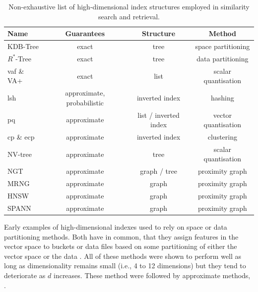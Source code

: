 \begin{table}
    \begin{tabular}{ | l | c | c | c |}
        \hline
        \textbf{Name} & \textbf{Guarantees} & \textbf{Structure} & \textbf{Method} \\
        \hline
        \hline
        KDB-Tree \cite{Robinson:1981KDB} & exact & tree & space partitioning \\  
        \hline
        $R^{*}$-Tree \cite{Beckmann:1990RTree} & exact & tree & data partitioning \\ 
        \hline
        \acrshort{vaf} \& VA+ \cite{Weber:1998Va,Ferhatosmanoglu:2000Vector} & exact & list & scalar quantisation \\ 
        \hline
        \acrshort{lsh} \cite{Indyk1998:Approximate, Wang:2017ASurvey} & approximate, probabilistic & inverted index & hashing \\ 
        \hline
        \acrshort{pq} \cite{Jegou:2010Product} & approximate & list / inverted index & vector quantisation \\
        \hline 
        \acrshort{cp} \& e\acrshort{cp} \cite{Chierichetti:2007Finding,Gudmundsson:2010Large} & approximate & inverted index & clustering \\ 
        \hline
        NV-tree \cite{Lejsek:2009NVTree} & approximate & tree & scalar quantisation \\ 
        \hline
        NGT \cite{Iwasaki2016:Pruned} & approximate & graph / tree & proximity graph \\ 
        \hline
        MRNG \cite{Lejsek:2009NVTree} & approximate & graph & proximity graph \\ 
        \hline
        HNSW \cite{Malkov:2018Efficient} & approximate & graph & proximity graph \\ 
        \hline
        SPANN \cite{Chen:2021SPANN} & approximate & graph & proximity graph \\ 
        \hline
    \end{tabular}
    \caption{Non-exhaustive list of high-dimensional index structures employed in similarity search and retrieval.}
    \label{table:index_structures}
\end{table}

Early examples of high-dimensional indexes used to rely on space or data partitioning methods. Both have in common, that they assign features in the vector space to buckets or data files based on some partitioning of either the vector space \cite{Bentley:1975Multidimensional,Robinson:1981KDB,Finkel:1974Quad} or the data \cite{Guttmann:1984RTrees,Beckmann:1990RTree,Ciaccia:1997Mtree}. All of these methods were shown to perform well as long as dimensionality remains small (i.e., 4 to 12 dimensions) but they tend to deteriorate as $d$ increases. These method were followed by approximate methods, \cite{Indyk1998:Approximate,Jegou:2010Product}.

